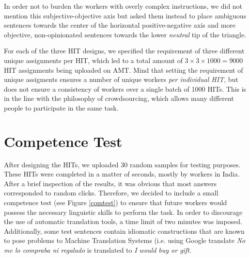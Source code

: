 \documentclass[11pt, a4paper,onecolumn]{article}
\begin{document}
In order not to burden the workers with overly complex instructions, we did not mention this subjective-objective axis but asked them instead to place ambiguous sentences towards the center of the horizontal positive-negative axis and more objective, non-opinionated sentences towards the lower \textit{neutral} tip of the triangle.

For each of the three HIT designs, we specified the requirement of three different unique assignments per HIT, which led to a total amount of $3 \times 3 \times 1000 = 9000$ HIT assignments being uploaded on AMT. Mind that setting the requirement of unique assigments ensures a number of unique workers \textit{per individual HIT}, but does not ensure a consistency of workers over a single batch of 1000 HITs. This is in the line with the philosophy of crowdsourcing, which allows many different people to participate in the same task.


\section{Competence Test}
\label{sect:comtest}

After designing the HITs, we uploaded 30 random samples for testing purposes. These HITs were completed in a matter of seconds, mostly by workers in India. After a brief inspection of the results, it was obvious that most answers corresponded to random clicks. Therefore, we decided to include a small competence test (see Figure \ref{comtest}) to ensure that future workers would possess the necessary linguistic skills to perform the task. In order to discourage the use of automatic translation tools, a time limit of two minutes was imposed. Additionally, some test sentences contain idiomatic constructions that are known to pose problems to Machine Translation Systems (i.e. using Google translate \textit{No me lo compraba ni regalado} is translated to \textit{I would buy or gift}.
\end{document}
